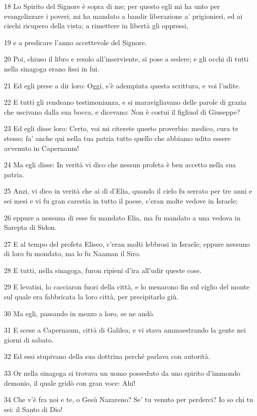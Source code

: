 \par 18 Lo Spirito del Signore è sopra di me; per questo egli mi ha unto per evangelizzare i poveri; mi ha mandato a bandir liberazione a' prigionieri, ed ai ciechi ricupero della vista; a rimettere in libertà gli oppressi,
\par 19 e a predicare l'anno accettevole del Signore.
\par 20 Poi, chiuso il libro e resolo all'inserviente, si pose a sedere; e gli occhi di tutti nella sinagoga erano fissi in lui.
\par 21 Ed egli prese a dir loro: Oggi, s'è adempiuta questa scrittura, e voi l'udite.
\par 22 E tutti gli rendeano testimonianza, e si maravigliavano delle parole di grazia che uscivano dalla sua bocca, e dicevano: Non è costui il figliuol di Giuseppe?
\par 23 Ed egli disse loro: Certo, voi mi citerete questo proverbio: medico, cura te stesso; fa' anche qui nella tua patria tutto quello che abbiamo udito essere avvenuto in Capernaum!
\par 24 Ma egli disse: In verità vi dico che nessun profeta è ben accetto nella sua patria.
\par 25 Anzi, vi dico in verità che ai dì d'Elia, quando il cielo fu serrato per tre anni e sei mesi e vi fu gran carestia in tutto il paese, c'eran molte vedove in Israele;
\par 26 eppure a nessuna di esse fu mandato Elia, ma fu mandato a una vedova in Sarepta di Sidon.
\par 27 E al tempo del profeta Eliseo, c'eran molti lebbrosi in Israele; eppure nessuno di loro fu mondato, ma lo fu Naaman il Siro.
\par 28 E tutti, nella sinagoga, furon ripieni d'ira all'udir queste cose.
\par 29 E levatisi, lo cacciaron fuori della città, e lo menarono fin sul ciglio del monte sul quale era fabbricata la loro città, per precipitarlo giù.
\par 30 Ma egli, passando in mezzo a loro, se ne andò.
\par 31 E scese a Capernaum, città di Galilea; e vi stava ammaestrando la gente nei giorni di sabato.
\par 32 Ed essi stupivano della sua dottrina perché parlava con autorità.
\par 33 Or nella sinagoga si trovava un uomo posseduto da uno spirito d'immondo demonio, il quale gridò con gran voce: Ahi!
\par 34 Che v'è fra noi e te, o Gesù Nazareno? Se' tu venuto per perderci? Io so chi tu sei: il Santo di Dio!
